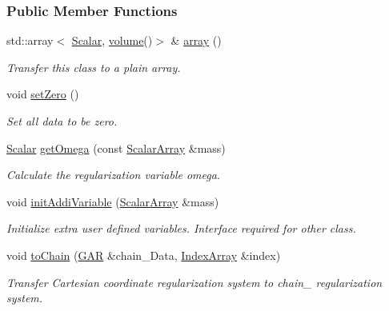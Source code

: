 \subsubsection*{Public Member Functions}
\begin{DoxyCompactItemize}
\item 
std\+::array$<$ \mbox{\hyperlink{class_g_a_r_a2ae44eda8e28d5dd26cf707dcda69314}{Scalar}}, \mbox{\hyperlink{class_g_a_r_abdbcc31db058125bd2ee207e7648b20b}{volume}}()$>$ \& \mbox{\hyperlink{class_g_a_r_a152aa5eea95fe568b010d85a7ba23bf7}{array}} ()
\begin{DoxyCompactList}\small\item\em Transfer this class to a plain array. \end{DoxyCompactList}\item 
void \mbox{\hyperlink{class_g_a_r_a3c59ee9bf8aae928644fa2beabbffa7c}{set\+Zero}} ()
\begin{DoxyCompactList}\small\item\em Set all data to be zero. \end{DoxyCompactList}\item 
\mbox{\hyperlink{class_g_a_r_a2ae44eda8e28d5dd26cf707dcda69314}{Scalar}} \mbox{\hyperlink{class_g_a_r_a3d5871f25d147497399fa65343bca84a}{get\+Omega}} (const \mbox{\hyperlink{class_g_a_r_a0b446684ae922457a3bf86c904085d8a}{Scalar\+Array}} \&mass)
\begin{DoxyCompactList}\small\item\em Calculate the regularization variable omega. \end{DoxyCompactList}\item 
void \mbox{\hyperlink{class_g_a_r_a31b5ad2527cc52d1422fa11e2d93fbc6}{init\+Addi\+Variable}} (\mbox{\hyperlink{class_g_a_r_a0b446684ae922457a3bf86c904085d8a}{Scalar\+Array}} \&mass)
\begin{DoxyCompactList}\small\item\em Initialize extra user defined variables. Interface required for other class. \end{DoxyCompactList}\item 
void \mbox{\hyperlink{class_g_a_r_a18041ac48dc47e6ada3e8a33893b1200}{to\+Chain}} (\mbox{\hyperlink{class_g_a_r}{G\+AR}} \&chain_\+Data, \mbox{\hyperlink{class_g_a_r_aaf033049c0cd8f0f86a82b9595086fa5}{Index\+Array}} \&index)
\begin{DoxyCompactList}\small\item\em Transfer Cartesian coordinate regularization system to chain_ regularization system. \end{DoxyCompactList}\item

\end{DoxyCompactItemize}
